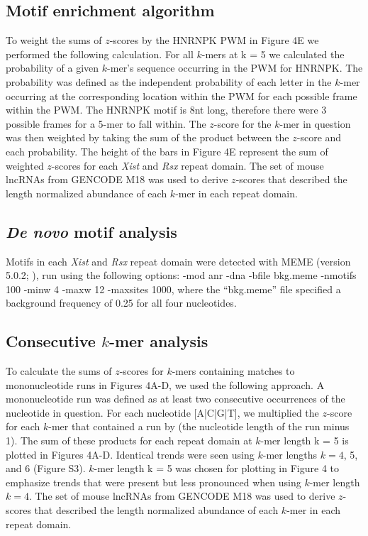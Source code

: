 \subsection{Motif enrichment algorithm}

To weight the sums of $z$-scores by the HNRNPK PWM in Figure 4E we performed the following calculation. For all $k$-mers at k = 5 we calculated the probability of a given $k$-mer’s sequence occurring in the PWM for HNRNPK. The probability was defined as the independent probability of each letter in the $k$-mer occurring at the corresponding location within the PWM for each possible frame within the PWM. The HNRNPK motif is 8nt long, therefore there were 3 possible frames for a 5-mer to fall within. The $z$-score for the $k$-mer in question was then weighted by taking the sum of the product between the $z$-score and each probability. The height of the bars in Figure 4E represent the sum of weighted $z$-scores for each \emph{Xist} and \emph{Rsx} repeat domain. The set of mouse lncRNAs from GENCODE M18 was used to derive $z$-scores that described the length normalized abundance of each $k$-mer in each repeat domain.  

\subsection{\emph{De novo} motif analysis}
Motifs in each \emph{Xist} and \emph{Rsx} repeat domain were detected with MEME (version 5.0.2; \cite{Bailey2009MEMESearching}), run using the following options: -mod anr -dna -bfile bkg.meme -nmotifs 100 -minw
4 -maxw 12 -maxsites 1000, where the “bkg.meme” file specified a background frequency of 0.25 for all four nucleotides.

\subsection{Consecutive $k$-mer analysis}

To calculate the sums of $z$-scores for $k$-mers containing matches to mononucleotide runs in Figures 4A-D, we used the following approach. A mononucleotide run was defined as at least two consecutive occurrences of the nucleotide in question. For each nucleotide [A|C|G|T], we multiplied the $z$-score for each $k$-mer that contained a run by (the nucleotide length of the run minus 1). The sum of these products for each repeat domain at $k$-mer length k = 5 is plotted in Figures 4A-D. Identical trends were seen using $k$-mer lengths $k = 4$, 5, and 6 (Figure S3). $k$-mer length k = 5 was chosen for plotting in Figure 4 to emphasize trends that were present but less pronounced when using $k$-mer length $k = 4$. The set of mouse lncRNAs from GENCODE M18 was used to derive $z$-scores that described the length normalized abundance of each $k$-mer in each repeat domain.

